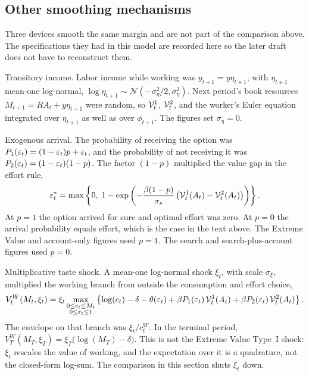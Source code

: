 \subsection{Other smoothing mechanisms}\label{subsec:ret_other_smoothers}
Three devices smooth the same margin and are not part of the comparison above.
The specifications they had in this model are recorded here so the later draft
does not have to reconstruct them.

Transitory income. Labor income while working was $y_{t+1}=y\eta_{t+1}$, with
$\eta_{t+1}$ mean-one log-normal,
$\log\eta_{t+1}\sim\mathcal{N}(-\sigma_\eta^2/2,\sigma_\eta^2)$. Next period's
book resources $M_{t+1}=RA_t+y\eta_{t+1}$ were random, so $\mathcal{V}_t^1$,
$\mathcal{V}_t^2$, and the worker's Euler equation integrated over $\eta_{t+1}$ as
well as over $\phi_{t+1}$. The figures set $\sigma_\eta=0$.

Exogenous arrival. The probability of receiving the option was
$P_1(\varepsilon_t)=(1-\varepsilon_t)p+\varepsilon_t$, and the probability of not receiving it was
$P_2(\varepsilon_t)=(1-\varepsilon_t)(1-p)$. The factor $(1-p)$ multiplied the value gap in the
effort rule,
\begin{equation}
\varepsilon_t^* = \max\left\{0,\; 1 - \exp\left( -\frac{\beta(1-p)}{\sigma_s}
\left( \mathcal{V}_t^1(A_t) - \mathcal{V}_t^2(A_t) \right) \right)\right\}.
\end{equation}
At $p=1$ the option arrived for sure and optimal effort was zero. At $p=0$ the
arrival probability equals effort, which is the case in the text above. The
Extreme Value and account-only figures used $p=1$. The search and
search-plus-account figures used $p=0$.

Multiplicative taste shock. A mean-one log-normal shock $\xi_t$, with scale
$\sigma_\xi$, multiplied the working branch from outside the consumption and
effort choice,
\begin{equation}
V_t^{W}(M_t,\xi_t)
= \xi_t\max_{\substack{0\le c_t\le M_t\\ 0\le\varepsilon_t\le 1}}
\left\{
\log(c_t)-\delta-\theta(\varepsilon_t)
+\beta P_1(\varepsilon_t)\,\mathcal{V}_t^{1}(A_t)
+\beta P_2(\varepsilon_t)\,\mathcal{V}_t^{2}(A_t)
\right\}.
\end{equation}
The envelope on that branch was $\xi_t/c_t^{W}$. In the terminal period,
$V_T^{W}(M_T,\xi_T)=\xi_T\bigl(\log(M_T)-\delta\bigr)$. This is not the Extreme
Value Type~I shock: $\xi_t$ rescales the value of working, and the expectation
over it is a quadrature, not the closed-form log-sum. The comparison in this
section shuts $\xi_t$ down.

